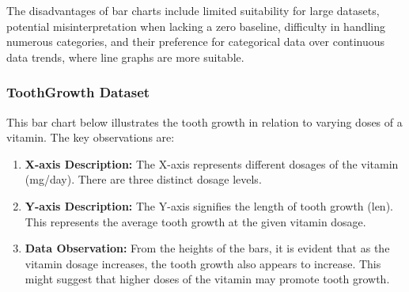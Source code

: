 \documentclass{article}\usepackage[]{graphicx}\usepackage[]{xcolor}
\begin{document}
The disadvantages of bar charts include limited suitability for large datasets, potential misinterpretation when lacking a zero baseline, difficulty in handling numerous categories, and their preference for categorical data over continuous data trends, where line graphs are more suitable.

\subsubsection{ToothGrowth Dataset}

This bar chart below illustrates the tooth growth in relation to varying doses of a vitamin. The key observations are:

\begin{enumerate}
    \item \textbf{X-axis Description:} The X-axis represents different dosages of the vitamin (mg/day). There are three distinct dosage levels.
    
    \item \textbf{Y-axis Description:} The Y-axis signifies the length of tooth growth (len). This represents the average tooth growth at the given vitamin dosage.
    \item \textbf{Data Observation:} From the heights of the bars, it is evident that as the vitamin dosage increases, the tooth growth also appears to increase. This might suggest that higher doses of the vitamin may promote tooth growth.
\end{enumerate}
\end{document}
